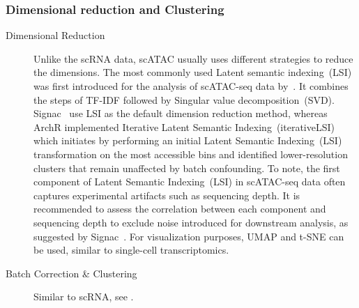 \subsubsection{Dimensional reduction and Clustering}
\begin{description}
	\item[Dimensional Reduction]
	Unlike the scRNA data, scATAC usually uses different strategies to reduce the dimensions. The most commonly used Latent semantic indexing~(LSI) was first introduced for the analysis of scATAC-seq data by~\cite{cusanovich2015multiplex}. It combines the steps of TF-IDF followed by Singular value decomposition~(SVD). Signac~\citep{signac} use LSI as the default dimension reduction method, whereas ArchR implemented Iterative Latent Semantic Indexing~(iterativeLSI)~\citep{satpathy2019massively, granja2019single} which initiates by performing an initial Latent Semantic Indexing~(LSI) transformation on the most accessible bins and identified lower-resolution clusters that remain unaffected by batch confounding. To note, the first component of Latent Semantic Indexing~(LSI) in scATAC-seq data often captures experimental artifacts such as sequencing depth. It is recommended to assess the correlation between each component and sequencing depth to exclude noise introduced for downstream analysis, as suggested by Signac~\citep{signac}. For visualization purposes, UMAP and t-SNE can be used, similar to single-cell transcriptomics.

	\item[Batch Correction \& Clustering]
	Similar to scRNA, see .


\end{description}

